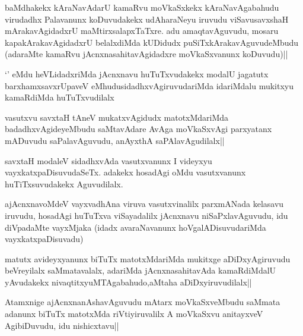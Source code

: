 
\begin{artha}
baMdhakekx kAraNavAdarU kamaRvu moVkaSxkekx kAraNavAgabahudu virudadhx Palavanunx koDuvudakekx udAharaNeyu iruvudu viSavusavxshaH mArakavAgidadxrU maMtirxsalapxTaTxre. adu amaqtavAguvudu, mosaru kapakArakavAgidadxrU belalxdiMda kUDidudx puSiTxkArakavAguvudeMbudu (adaraMte kamaRvu jAcnxnasahitavAgidadxre moVkaSxvanunx koDuvudu)||
\end{artha}


\begin{artha}
`\stext' eMdu heVLidadxriMda jAcnxnavu huTuTxvudakekx modalU jagatutx barxhamxsavxrUpaveV eMhudusidadhxvAgiruvudariMda idariMdalu mukitxyu kamaRdiMda huTuTxvudilalx
\end{artha}

\begin{artha}
vasutxvu savxtaH tAneV mukatxvAgidudx matotxMdariMda badadhxvAgideyeMbudu saMtavAdare AvAga moVkaSxvAgi parxyatanx mADuvudu saPalavAguvudu, anAyxthA saPAlavAgudilalx||
\end{artha}


\begin{artha}
savxtaH modaleV sidadhxvAda vasutxvanunx I videyxyu vayxkatxpaDisuvudaSeTx. adakekx hosadAgi oMdu vasutxvanunx huTiTxsuvudakekx Aguvudilalx.
\end{artha}

\begin{artha}
ajAcnxnavoMdeV vayxvadhAna viruva vasutxvinalilx parxmANada kelasavu iruvudu, hosadAgi huTuTxva viSayadalilx jAcnxnavu niSaPxlavAguvudu, idu diVpadaMte vayxMjaka (idadx avaraNavanunx hoVgalADisuvudariMda vayxkatxpaDisuvadu)
\end{artha}


\begin{artha}
matutx avideyxyanunx biTuTx matotxMdariMda mukitxge aDiDxyAgiruvudu beVreyilalx saMmatavalalx, adariMda jAcnxnasahitavAda kamaRdiMdalU yAvudakekx nivaqtitxyuMTAgabahudo,aMtaha aDiDxyiruvudilalx||
\end{artha}

\begin{artha}
Atamxnige ajAcnxnanAshavAguvudu mAtarx moVkaSxveMbudu saMmata adanunx biTuTx matotxMda riVtiyiruvalilx A moVkaSxvu anitayxveV AgibiDuvudu, idu nishicxtavu||
\end{artha}

